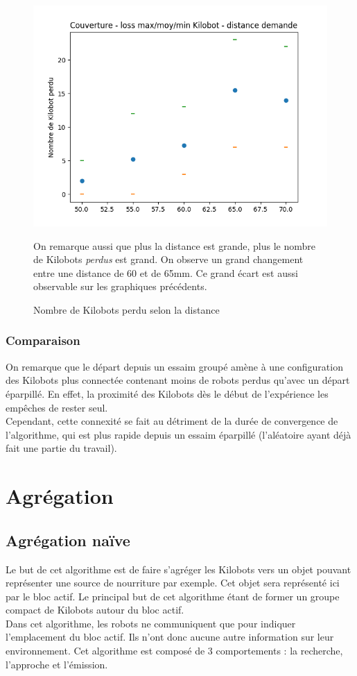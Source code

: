 \documentclass[a4paper]{article}
\begin{document}
\begin{figure}[h!]
	\begin{minipage}[c]{.46\linewidth}
		\centering
	\includegraphics[width=1.1\linewidth]{../../script_results/Couverture_loss_kilobot.png}
	\caption{Nombre de Kilobots perdu selon la distance}
	\end{minipage}
	\begin{minipage}[c]{.46\linewidth}
	On remarque aussi que plus la distance est grande, plus le nombre de Kilobots \textit{perdus} est grand. On observe un grand changement entre une distance de 60 et de 65mm. Ce grand écart est aussi observable sur les graphiques précédents.
	\end{minipage}
\end{figure}
\newpage
\subsubsection{Comparaison}
On remarque que le départ depuis un essaim groupé amène à une configuration des Kilobots plus connectée contenant moins de robots perdus qu'avec un départ éparpillé. En effet, la proximité des Kilobots dès le début de l'expérience les empêches de rester seul.\\ Cependant, cette connexité se fait au détriment de la durée de convergence de l'algorithme, qui est plus rapide depuis un essaim éparpillé (l'aléatoire ayant déjà fait une partie du travail).
\newpage
\section{Agrégation}
\subsection{Agrégation naïve}
Le but de cet algorithme est de faire s'agréger les Kilobots vers un objet  pouvant représenter une source de nourriture par exemple. Cet objet sera représenté ici par le bloc actif. Le principal but de cet algorithme étant de former un groupe compact de Kilobots autour du bloc actif.\\
Dans cet algorithme, les robots ne communiquent que pour indiquer l'emplacement du bloc actif. Ils n'ont donc aucune autre information sur leur environnement. Cet algorithme est composé de 3 comportements : la recherche, l'approche et l'émission.\\
\end{document}
